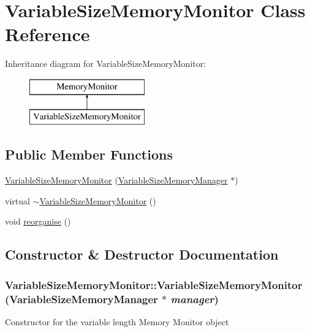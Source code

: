 \hypertarget{classVariableSizeMemoryMonitor}{
\section{VariableSizeMemoryMonitor Class Reference}
\label{classVariableSizeMemoryMonitor}
}
Inheritance diagram for VariableSizeMemoryMonitor:\begin{figure}[H]
\begin{center}
\leavevmode
\includegraphics[height=2cm]{classVariableSizeMemoryMonitor}
\end{center}
\end{figure}
\subsection*{Public Member Functions}
\begin{DoxyCompactItemize}
\item 
\hyperlink{classVariableSizeMemoryMonitor_a08f474544f1c9a12b27d12319a4fce9d}{VariableSizeMemoryMonitor} (\hyperlink{classVariableSizeMemoryManager}{VariableSizeMemoryManager} $\ast$)
\item 
virtual \hyperlink{classVariableSizeMemoryMonitor_a5495eb465a7ba0d742ec7f36a276cb4c}{$\sim$VariableSizeMemoryMonitor} ()
\item 
void \hyperlink{classVariableSizeMemoryMonitor_aac18cf1e82190d4b9bdb1d09729b7cd6}{reorganise} ()
\end{DoxyCompactItemize}


\subsection{Constructor \& Destructor Documentation}
\hypertarget{classVariableSizeMemoryMonitor_a08f474544f1c9a12b27d12319a4fce9d}{
\subsubsection[{VariableSizeMemoryMonitor}]{\setlength{\rightskip}{0pt plus 5cm}VariableSizeMemoryMonitor::VariableSizeMemoryMonitor ({\bf VariableSizeMemoryManager} $\ast$ {\em manager})}}
\label{classVariableSizeMemoryMonitor_a08f474544f1c9a12b27d12319a4fce9d}
Constructor for the variable length Memory Monitor object


